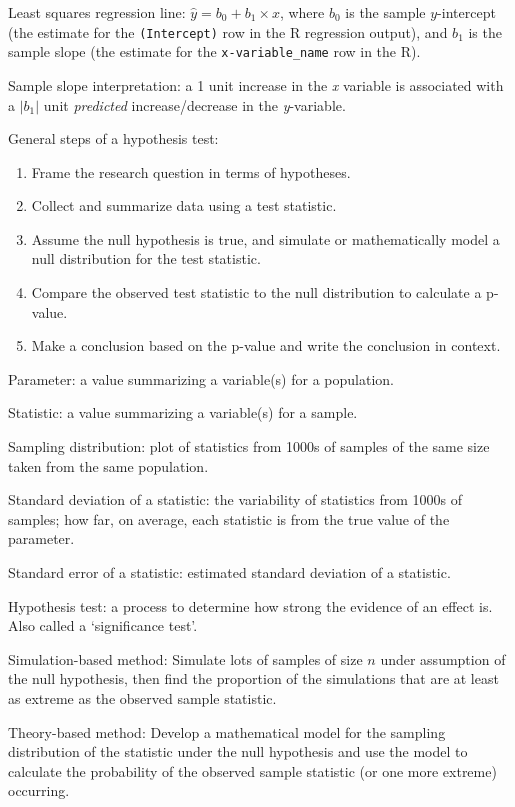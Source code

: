 \documentclass[
]{report}
\begin{document}

Least squares regression line: \(\hat{y} = b_0+b_1 \times x\), where \(b_0\) is the sample \(y\)-intercept (the estimate for the \texttt{(Intercept)} row in the R regression output), and \(b_1\) is the sample slope (the estimate for the \texttt{x-variable\_name} row in the R).

Sample slope interpretation: a 1 unit increase in the \emph{x} variable is associated with a \(|b_1|\) unit \emph{predicted} increase/decrease in the \emph{y}-variable.

General steps of a hypothesis test:

\begin{enumerate}
\def\labelenumi{\arabic{enumi}.}
\item
  Frame the research question in terms of hypotheses.
\item
  Collect and summarize data using a test statistic.
\item
  Assume the null hypothesis is true, and simulate or mathematically model a null distribution for the test statistic.
\item
  Compare the observed test statistic to the null distribution to calculate a p-value.
\item
  Make a conclusion based on the p-value and write the conclusion in context.
\end{enumerate}

Parameter: a value summarizing a variable(s) for a population.

Statistic: a value summarizing a variable(s) for a sample.

Sampling distribution: plot of statistics from 1000s of samples of the same size taken from the same population.

Standard deviation of a statistic: the variability of statistics from 1000s of samples; how far, on average, each statistic is from the true value of the parameter.

Standard error of a statistic: estimated standard deviation of a statistic.

Hypothesis test: a process to determine how strong the evidence of an effect is. Also called a `significance test'.

Simulation-based method: Simulate lots of samples of size \(n\) under assumption of the null hypothesis, then find the proportion of the simulations that are at least as extreme as the observed sample statistic.

Theory-based method: Develop a mathematical model for the sampling distribution of the statistic under the null hypothesis and use the model to calculate the probability of the observed sample statistic (or one more extreme) occurring.
\end{document}

